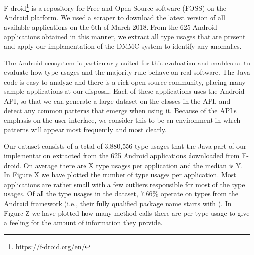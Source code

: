 F-droid\footnote{\url{https://f-droid.org/en/}} is a repository for Free and Open Source software (FOSS) on the Android platform.
We used a scraper to download the latest version of all available applications on the 6th of March 2018.
From the 625 Android applications obtained in this manner, we extract all type usages that are present and apply our implementation of the $\text{DMMC}$ system to identify any anomalies.

The Android ecosystem is particularly suited for this evaluation and enables us to evaluate how type usages and the majority rule behave on real software.
The Java code is easy to analyze and there is a rich open source community, placing many sample applications at our disposal.
Each of these applications uses the Android API, so that we can generate a large dataset on the classes in the API, and detect any common patterns that emerge when using it.
Because of the API's emphasis on the user interface, we consider this to be an environment in which patterns will appear most frequently and most clearly.

Our dataset consists of a total of 3,880,556 type usages that the Java part of our implementation extracted from the 625 Android applications downloaded from F-droid.
On average there are X type usages per application and the median is Y.
In Figure X we have plotted the number of type usages per application.
Most applications are rather small with a few outliers responsible for most of the type usages.
Of all the type usages in the dataset, $7.66\%$ operate on types from the Android framework (i.e., their fully qualified package name starts with ).
In Figure Z we have plotted how many method calls there are per type usage to give a feeling for the amount of information they provide.

